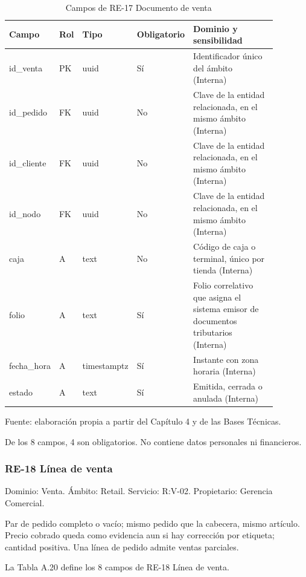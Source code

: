 \documentclass[11pt]{article}
\begin{document}
\begin{table}[htbp]
\caption{Campos de RE-17 Documento de venta}\label{tab:d_re17}
\centering
\begin{tabular}{@{}p{0.167\linewidth}p{0.070\linewidth}p{0.079\linewidth}p{0.097\linewidth}p{0.465\linewidth}@{}}
\toprule Campo & Rol & Tipo & Obligatorio & Dominio y sensibilidad \\
\midrule
id\_venta & PK & uuid & Sí & Identificador único del ámbito (Interna) \\
id\_pedido & FK & uuid & No & Clave de la entidad relacionada, en el mismo ámbito (Interna) \\
id\_cliente & FK & uuid & No & Clave de la entidad relacionada, en el mismo ámbito (Interna) \\
id\_nodo & FK & uuid & No & Clave de la entidad relacionada, en el mismo ámbito (Interna) \\
caja & A & text & No & Código de caja o terminal, único por tienda (Interna) \\
folio & A & text & Sí & Folio correlativo que asigna el sistema emisor de documentos tributarios (Interna) \\
fecha\_hora & A & timestamptz & Sí & Instante con zona horaria (Interna) \\
estado & A & text & Sí & Emitida, cerrada o anulada (Interna) \\
\bottomrule
\end{tabular}
\par\smallskip
{\raggedright Fuente: elaboración propia a partir del Capítulo 4 y de las Bases Técnicas.\par}
\end{table}


De los 8 campos, 4 son obligatorios. No contiene datos personales ni financieros.

\subsubsection{RE-18 Línea de venta}

Dominio: Venta. Ámbito: Retail. Servicio: R:V-02. Propietario: Gerencia Comercial.

Par de pedido completo o vacío; mismo pedido que la cabecera, mismo artículo. Precio cobrado queda como evidencia aun si hay corrección por etiqueta; cantidad positiva. Una línea de pedido admite ventas parciales.

La Tabla A.20 define los 8 campos de RE-18 Línea de venta.
\end{document}
